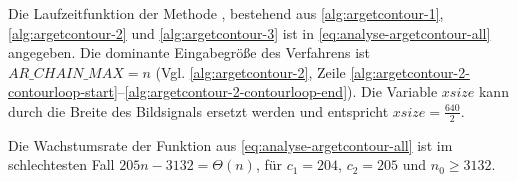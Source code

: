 Die Laufzeitfunktion der Methode , bestehend aus \autoref{alg:argetcontour-1},
 \autoref{alg:argetcontour-2} und \autoref{alg:argetcontour-3} ist in \autoref{eq:analyse-argetcontour-all} angegeben.
 Die dominante Eingabegröße des Verfahrens ist $\mathit{AR\_CHAIN\_MAX} = n$ (Vgl. \autoref{alg:argetcontour-2},
 Zeile \ref{alg:argetcontour-2-contourloop-start}--\ref{alg:argetcontour-2-contourloop-end}). Die Variable
 $\mathit{xsize}$ kann durch die Breite des Bildsignals ersetzt werden und entspricht $\mathit{xsize} = \tfrac{640}{2}$.

Die Wachstumsrate der Funktion aus \autoref{eq:analyse-argetcontour-all} ist im schlechtesten Fall
 $205n - 3132 = \Theta(n)$, für $c_{1} = 204$, $c_{2} = 205$ und $n_{0} \geq 3132$.
